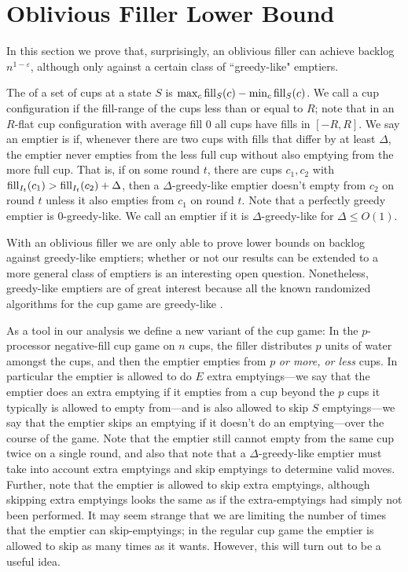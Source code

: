 \section{Oblivious Filler Lower Bound}\label{sec:oblivious}
In this section we prove that, surprisingly, an oblivious filler
can achieve backlog $n^{1-\varepsilon}$, although only against a
certain class of ``greedy-like" emptiers.

The  of a set of cups at a state $S$ is $\max_c
\operatorname{\text{\textup{fill}}}_S(c) - \min_c \operatorname{\text{\textup{fill}}}_S(c)$. We call a cup configuration
 if the fill-range of the cups less than or equal to
$R$; note that in an $R$-flat cup configuration with average fill
$0$ all cups have fills in $[-R, R]$. We say an emptier is
 if, whenever there are two cups with
fills that differ by at least $\Delta$, the emptier never empties
from the less full cup without also emptying from the more full
cup. That is, if on some round $t$, there are cups $c_1, c_2$
with $\operatorname{\text{\textup{fill}}}_{I_t}(c_1) > \operatorname{\text{\textup{fill}}}_{I_t}(c_2) + \Delta$, then a
$\Delta$-greedy-like emptier doesn't empty from $c_2$ on round
$t$ unless it also empties from $c_1$ on round $t$. Note that a
perfectly greedy emptier is $0$-greedy-like. We call an emptier
 if it is $\Delta$-greedy-like for $\Delta \le
O(1)$. 

With an oblivious filler we are only able to prove lower bounds
on backlog against greedy-like emptiers; whether or not our
results can be extended to a more general class of emptiers is an
interesting open question. Nonetheless, greedy-like emptiers are
of great interest because all the known randomized algorithms for
the cup game are greedy-like \cite{mbe19, wku20}.

As a tool in our analysis we define a new variant of the cup
game: In the $p$-processor 
 negative-fill cup game on $n$ cups, the filler
distributes $p$ units of water amongst the cups, and then the
emptier empties from $p$ \textit{or more, or less} cups. In
particular the emptier is allowed to do $E$ extra
emptyings---we say that the emptier does an extra emptying if
it empties from a cup beyond the $p$ cups it typically is
allowed to empty from---and is also allowed to skip $S$
emptyings---we say that the emptier skips an emptying if it
doesn't do an emptying---over the course of the
game. Note that the emptier still cannot empty from the same cup
twice on a single round, and also that note
that a $\Delta$-greedy-like emptier must take into account extra
emptyings and skip emptyings to determine valid moves. Further,
note that the emptier is allowed to skip extra emptyings,
although skipping extra emptyings looks the same as if the
extra-emptyings had simply not been performed.
It may seem strange that we are limiting the number of times that
the emptier can skip-emptyings; in the regular cup game the
emptier is allowed to skip as many times as it wants. However,
this will turn out to be a useful idea.


